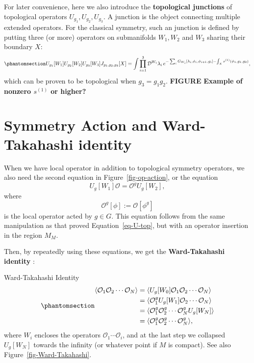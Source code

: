 \documentclass[11pt,toc=bibliography]{scrbook}
\numberwithin{equation}{section}
\begin{document}
For later convenience, here we also introduce the \textbf{topological
junctions} of topological operators \(U_{g_1},U_{g_2},U_{g_3}\). A
junction is the object connecting multiple extended operators. For the
classical symmetry, such an junction is defined by putting three (or
more) operators on submanifolds \(W_1,W_2\) and \(W_3\) sharing their
boundary \(X\):
\begin{equation}\phantomsection\label{eq-junction-action}{
U_{g_1}[W_1]U_{g_2}[W_2]U_{g_3}[W_3]J_{g_1,g_2,g_3}[X] 
=
\int\prod_{i=1}^3\mathcal{D}^{W_i}\lambda_i
\, e^{-\sum_i G_{W_i}[\lambda_i,\phi_i,\phi_{i+1},g_i]-\int_X s^{(1)}(\phi_1,g_1,g_2)},
}\end{equation} which can be proven to be topological when
\(g_3=g_1g_2\). \textbf{FIGURE} \textbf{Example of nonzero \(s^{(1)}\)
or higher?}

\section{Symmetry Action and Ward-Takahashi
identity}\label{symmetry-action-and-ward-takahashi-identity}

When we have local operator in addition to topological symmetry
operators, we also need the second equation in
Figure~\ref{fig-op-action}, or the equation \[
U_g[W_1] \mathcal{O} = \mathcal{O}^g U_g[W_2],
\] where \[\mathcal{O}^g[\phi] := \mathcal{O}[\phi^g]
\] is the local operator acted by \(g \in G\). This equation follows
from the same manipulation as that proved Equation~\ref{eq-U-top}, but
with an operator insertion in the region \(M_M\).

Then, by repeatedly using these equations, we get the
\textbf{Ward-Takahashi identity} :

\begin{important}{Ward-Takahashi Identity}
\begin{equation}\phantomsection\label{eq-Ward-Takahashi}{
\begin{aligned}
\langle \mathcal{O}_1 \mathcal{O}_2 \cdots \mathcal{O}_N \rangle
&= 
\langle U_g[W_0] \mathcal{O}_1 \mathcal{O}_2 \cdots \mathcal{O}_N \rangle\\
&= 
\langle \mathcal{O}_1^g U_g[W_1] \mathcal{O}_2 \cdots \mathcal{O}_N \rangle\\
&= 
\langle \mathcal{O}_1^g  \mathcal{O}_2^g \cdots \mathcal{O}_N^g U_g[W_N] \rangle\\
&= 
\langle \mathcal{O}_1^g  \mathcal{O}_2^g \cdots \mathcal{O}_N^g\rangle,
\end{aligned}
}\end{equation} where \(W_i\) encloses the operators
\(\mathcal{O}_1 \cdots \mathcal{O}_i\), and at the last step we
collapsed \(U_g[W_N]\) towards the infinity (or whatever point if \(M\)
is compact). See also Figure~\ref{fig-Ward-Takahashi}.
\end{important}
\end{document}
